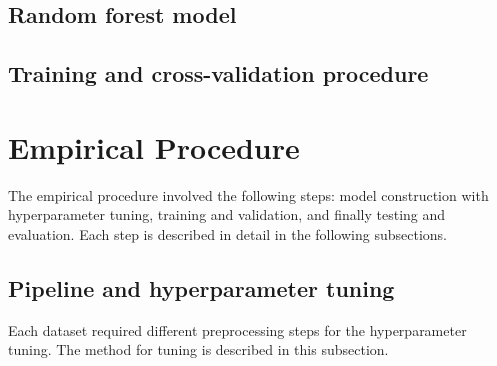 \documentclass[conference]{IEEEtran}
\begin{document}
\subsection{Random forest model}


\subsection{Training and cross-validation procedure}





\section{Empirical Procedure}
The empirical procedure involved the following steps: model construction with hyperparameter tuning, training and validation, and finally testing and evaluation. Each step is described in detail in the following subsections.

\subsection{Pipeline and hyperparameter tuning}
Each dataset required different preprocessing steps for the hyperparameter tuning. The method for tuning is described in this subsection.
\end{document}
